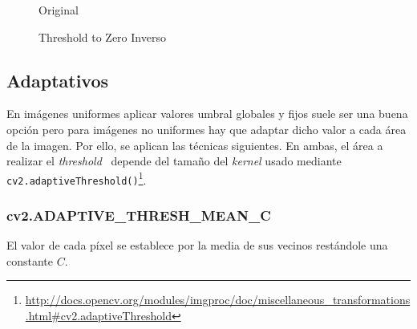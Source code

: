 \begin{figure}[H]
  \caption{Original}
  \centering \setlength\fboxsep{0pt} \setlength\fboxrule{0.5pt}
\end{figure}

\begin{figure}[H]
  \centering \setlength\fboxsep{0pt} \setlength\fboxrule{0.5pt}
  \caption{Threshold to Zero Inverso}
\end{figure}

\subsection{Adaptativos}
En imágenes uniformes aplicar valores umbral globales y fijos suele
ser una buena opción pero para imágenes no uniformes hay que adaptar
dicho valor a cada área de la imagen. Por ello, se aplican las
técnicas siguientes. En ambas, el área a realizar el
\emph{threshold}~\emph{\citep*[6.2 Adaptive
  Thresholding]{fisher1996hypermedia}} depende del tamaño del
\emph{kernel} usado mediante
\texttt{cv2.adaptiveThreshold()}\footnote{\url{http://docs.opencv.org/modules/imgproc/doc/miscellaneous\_transformations.html\#cv2.adaptiveThreshold}}.

\subsubsection{cv2.ADAPTIVE\_THRESH\_MEAN\_C}
El valor de cada píxel se establece por la media de sus vecinos
restándole una constante $C$.

